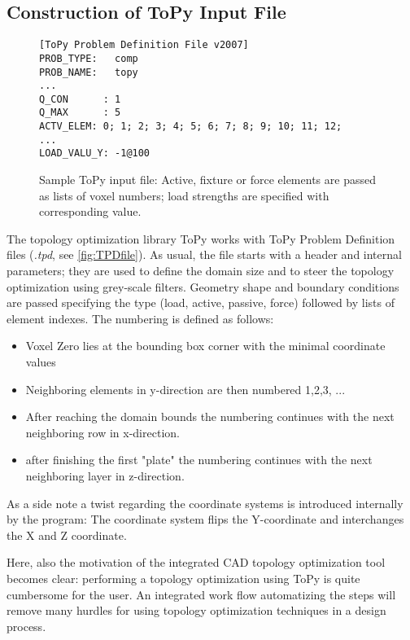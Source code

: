 \subsection{Construction of ToPy Input File}
\label{sec: ToPyInputConstruction}

\begin{figure}
\begin{lstlisting}
[ToPy Problem Definition File v2007]
PROB_TYPE:   comp
PROB_NAME:   topy
...
Q_CON      : 1
Q_MAX      : 5
ACTV_ELEM: 0; 1; 2; 3; 4; 5; 6; 7; 8; 9; 10; 11; 12; 
...
LOAD_VALU_Y: -1@100
\end{lstlisting}
\caption{Sample ToPy input file: Active, fixture or force elements are passed as lists of voxel numbers; load strengths are specified with corresponding value.}
\label{fig:TPDfile}
\end{figure}
The topology optimization library ToPy works with ToPy Problem Definition files ({\it.tpd}, see \autoref{fig:TPDfile}). As usual, the file starts with a header and internal parameters; they are used to define the domain size and to steer the topology optimization using grey-scale filters. Geometry shape and boundary conditions are passed specifying the type (load, active, passive, force) followed by lists of element indexes. The numbering is defined as follows:
\begin{itemize}
\item Voxel Zero lies at the bounding box corner with the minimal coordinate values
\item Neighboring elements in y-direction are then numbered 1,2,3, ...
\item After reaching the domain bounds the numbering continues with the next neighboring row in x-direction.
\item after finishing the first "plate" the numbering continues with the next neighboring layer in z-direction.
\end{itemize}
As a side note a twist regarding the coordinate systems is introduced internally by the program: The coordinate system flips the Y-coordinate and interchanges the X and Z coordinate. 

Here, also the motivation of the integrated CAD topology optimization tool becomes clear: performing a topology optimization using ToPy is quite cumbersome for the user. An integrated work flow automatizing the steps will remove many hurdles for using topology optimization techniques in a design process.  

